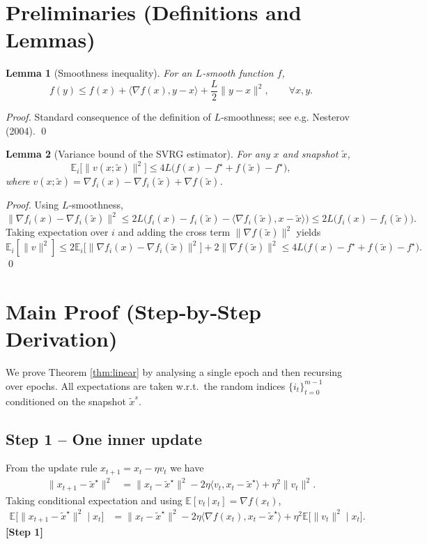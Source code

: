 \documentclass{article}
\newtheorem{lemma}{Lemma}[section]
\begin{document}
\section*{Preliminaries (Definitions and Lemmas)}
\begin{lemma}[Smoothness inequality]\label{lem:smooth}
For an $L$‑smooth function $f$,
\[
f(y)\le f(x)+\langle\nabla f(x),y-x\rangle+\frac{L}{2}\|y-x\|^{2},
\qquad\forall x,y .
\]
\end{lemma}
\begin{proof}
Standard consequence of the definition of $L$‑smoothness; see e.g. Nesterov (2004). \hfill\qed
\end{proof}

\begin{lemma}[Variance bound of the SVRG estimator]\label{lem:var}
For any $x$ and snapshot $\tilde{x}$,
\[
\mathbb{E}_{i}\!\bigl[\|v(x;\tilde{x})\|^{2}\bigr]
\le 4L\bigl(f(x)-f^{\star}+f(\tilde{x})-f^{\star}\bigr),
\]
where $v(x;\tilde{x})=\nabla f_{i}(x)-\nabla f_{i}(\tilde{x})+\nabla f(\tilde{x})$.
\end{lemma}
\begin{proof}
Using $L$‑smoothness,
\[
\|\nabla f_i(x)-\nabla f_i(\tilde{x})\|^{2}
\le 2L\bigl(f_i(x)-f_i(\tilde{x})-\langle\nabla f_i(\tilde{x}),x-\tilde{x}\rangle\bigr)
\le 2L\bigl(f_i(x)-f_i(\tilde{x})\bigr).
\]
Taking expectation over $i$ and adding the cross term $\|\nabla f(\tilde{x})\|^{2}$ yields
\[
\mathbb{E}_{i}[\|v\|^{2}]
\le 2\mathbb{E}_{i}\!\bigl[\|\nabla f_i(x)-\nabla f_i(\tilde{x})\|^{2}\bigr]
      +2\|\nabla f(\tilde{x})\|^{2}
\le 4L\bigl(f(x)-f^{\star}+f(\tilde{x})-f^{\star}\bigr).
\] 
\hfill\qed
\end{proof}

\section*{Main Proof (Step‑by‑Step Derivation)}
We prove Theorem \ref{thm:linear} by analysing a single epoch and then
recursing over epochs. All expectations are taken w.r.t.\ the random indices
$\{i_t\}_{t=0}^{m-1}$ conditioned on the snapshot $\tilde{x}^{s}$.

\subsection*{Step 1 – One inner update}
From the update rule $x_{t+1}=x_t-\eta v_t$ we have
\begin{align}
\|x_{t+1}-\tilde{x}^{\star}\|^{2}
&= \|x_t-\tilde{x}^{\star}\|^{2}
   -2\eta\langle v_t, x_t-\tilde{x}^{\star}\rangle
   +\eta^{2}\|v_t\|^{2}. \tag{1}
\end{align}
Taking conditional expectation and using $\mathbb{E}[v_t\,|\,x_t]=\nabla f(x_t)$,
\begin{align}
\mathbb{E}\!\bigl[\|x_{t+1}-\tilde{x}^{\star}\|^{2}\mid x_t\bigr]
&= \|x_t-\tilde{x}^{\star}\|^{2}
   -2\eta\langle\nabla f(x_t),x_t-\tilde{x}^{\star}\rangle
   +\eta^{2}\mathbb{E}\!\bigl[\|v_t\|^{2}\mid x_t\bigr].\tag{2}
\end{align}
\textbf{[Step 1]}
\end{document}

